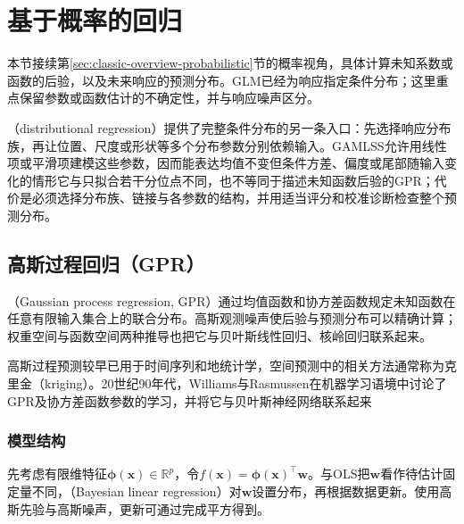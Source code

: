 \section{基于概率的回归}
\label{sec:regression-probabilistic}

本节接续第\ref{sec:classic-overview-probabilistic}节的概率视角，具体计算未知系数或函数的后验，以及未来响应的预测分布。GLM已经为响应指定条件分布；这里重点保留参数或函数估计的不确定性，并与响应噪声区分。

（distributional regression）提供了完整条件分布的另一条入口：先选择响应分布族，再让位置、尺度或形状等多个分布参数分别依赖输入。GAMLSS允许用线性项或平滑项建模这些参数，因而能表达均值不变但条件方差、偏度或尾部随输入变化的情形它与只拟合若干分位点不同，也不等同于描述未知函数后验的GPR；代价是必须选择分布族、链接与各参数的结构，并用适当评分和校准诊断检查整个预测分布。

\subsection{高斯过程回归（GPR）}
\label{sec:regression-gpr}

（Gaussian process regression, GPR）通过均值函数和协方差函数规定未知函数在任意有限输入集合上的联合分布。高斯观测噪声使后验与预测分布可以精确计算；权重空间与函数空间两种推导也把它与贝叶斯线性回归、核岭回归联系起来。

高斯过程预测较早已用于时间序列和地统计学，空间预测中的相关方法通常称为克里金（kriging）。20世纪90年代，Williams与Rasmussen在机器学习语境中讨论了GPR及协方差函数参数的学习，并将它与贝叶斯神经网络联系起来

\subsubsection{模型结构}
\label{sec:regression-gpr-structure}

先考虑有限维特征$\bm{\phi}(\bm{x})\in\mathbb{R}^{p}$，令$f(\bm{x})=\bm{\phi}(\bm{x})^{\top}\bm{w}$。与OLS把$\bm{w}$看作待估计固定量不同，（Bayesian linear regression）对$\bm{w}$设置分布，再根据数据更新。使用高斯先验与高斯噪声，更新可通过完成平方得到。

